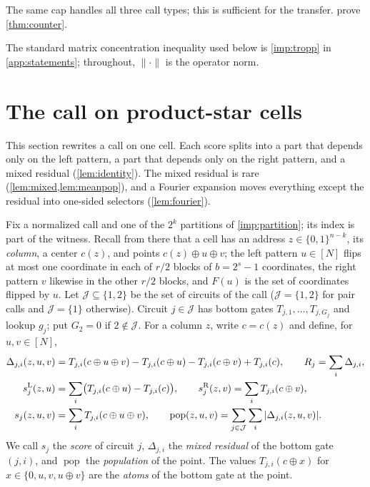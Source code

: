 \documentclass[11pt,letterpaper]{article}
\theoremstyle{definition}
\theoremstyle{remark}
\newcommand{\pop}{\operatorname{pop}}
\newcommand{\cJ}{\mathcal J}
\begin{document}
The same cap handles all three call types; this is sufficient for
the transfer.  prove
\cref{thm:counter}.

The standard matrix concentration inequality used below is
\cref{imp:tropp} in \cref{app:statements}; throughout,
\(\|\cdot\|\) is the operator norm.

\section{The call on product-star cells}\label{sec:cells}

This section rewrites a call on one cell. Each score splits into a
part that depends only on the left pattern, a part that depends only
on the right pattern, and a mixed residual (\cref{lem:identity}). The
mixed residual is rare (\cref{lem:mixed,lem:meanpop}), and a Fourier
expansion moves everything except the residual into one-sided
selectors (\cref{lem:fourier}).

Fix a normalized call and one of the \(2^k\) partitions of
\cref{imp:partition}; its index is part of the witness. Recall from
there that a cell has an address \(z\in\{0,1\}^{n-k}\), its
\emph{column}, a center \(c(z)\), and points \(c(z)\oplus u\oplus v\);
the left pattern \(u\in[N]\) flips at most one coordinate in each of
\(r/2\) blocks of \(b=2^s-1\) coordinates, the right pattern \(v\)
likewise in the other \(r/2\) blocks, and \(F(u)\) is the set of
coordinates flipped by \(u\). Let
\(\cJ\subseteq\{1,2\}\) be the set of circuits of the call
(\(\cJ=\{1,2\}\) for pair calls and \(\cJ=\{1\}\) otherwise). Circuit
\(j\in\cJ\) has bottom gates \(T_{j,1},\dots,T_{j,G_j}\) and lookup
\(g_j\); put \(G_2=0\) if \(2\notin\cJ\). For a column \(z\), write
\(c=c(z)\) and define, for \(u,v\in[N]\),
\begin{align*}
 \Delta_{j,i}(z,u,v)&=T_{j,i}(c\oplus u\oplus v)-T_{j,i}(c\oplus u)-T_{j,i}(c\oplus v)+T_{j,i}(c),
 \qquad R_j=\sum_{i}\Delta_{j,i},\\
 s^{\rm L}_j(z,u)&=\sum_i\bigl(T_{j,i}(c\oplus u)-T_{j,i}(c)\bigr),
 \qquad s^{\rm R}_j(z,v)=\sum_iT_{j,i}(c\oplus v),\\
 s_j(z,u,v)&=\sum_iT_{j,i}(c\oplus u\oplus v),
 \qquad \pop(z,u,v)=\sum_{j\in\cJ}\sum_i|\Delta_{j,i}(z,u,v)|.
\end{align*}
We call \(s_j\) the \emph{score} of circuit \(j\), \(\Delta_{j,i}\) the
\emph{mixed residual} of the bottom gate \((j,i)\), and \(\pop\) the
\emph{population} of the point. The values \(T_{j,i}(c\oplus x)\) for
\(x\in\{0,u,v,u\oplus v\}\) are the \emph{atoms} of the bottom gate at
the point.
\end{document}
